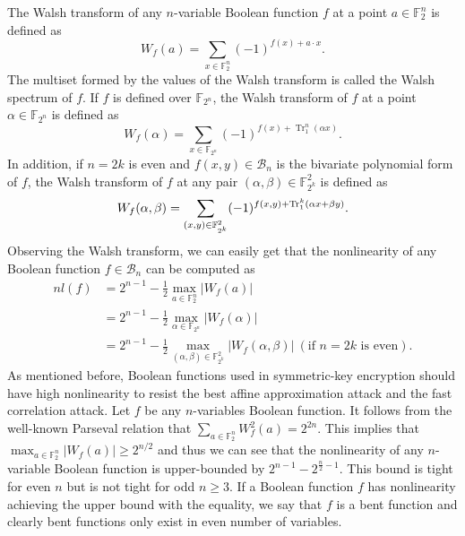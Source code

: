 \documentclass{article}
\newcommand{\F}{\mathbb{F}}
\newcommand{\0}{\textbf{0}}
\newcommand{\1}{\textbf{1}}
\newcommand{\TrN}{\operatorname{Tr}_1^n}
\theoremstyle{plain}
\begin{document}
    The Walsh transform of any $n$-variable Boolean function $f$ at a point $a\in\F_2^n$ is defined as
    \[W_f(a)=\sum_{x\in\F_2^n}(-1)^{f(x)+a\cdot x}.\]
    The multiset formed by the values of the Walsh transform is called the Walsh spectrum of $f$.
    If $f$ is defined over $\F_{2^n}$, the Walsh transform of $f$ at a point $\alpha\in\F_{2^n}$ is defined as
    \[W_f(\alpha)=\sum_{x\in\F_{2^n}}(-1)^{f(x)+\TrN(\alpha x)}.\]
    In addition, if $n=2k$ is even and $f(x,y)\in\mathcal{B}_n$ is the bivariate polynomial form of $f$, the Walsh transform of $f$ at any pair $(\alpha,\beta)\in\F_{2^k}^2$ is defined as
    \[W_f(\alpha,\beta)=\sum_{(x,y)\in\F_{2^k}^2}(-1)^{f(x,y)+\Tr_1^k(\alpha x+\beta y)}.\]
    Observing the Walsh transform, we can easily get that the nonlinearity of any Boolean function $f\in\mathcal{B}_n$ can be computed as
    \begin{align*}
        nl(f) &= 2^{n-1} - \frac{1}{2}\max_{a\in\F_2^n}|W_f(a)|\\
              &= 2^{n-1} - \frac{1}{2}\max_{\alpha\in\F_{2^n}}|W_f(\alpha)|\\
              &= 2^{n-1} - \frac{1}{2}\max_{(\alpha,\beta)\in\F_{2^k}^2}|W_f(\alpha,\beta)|~(\text{if }n=2k\text{ is even}).
    \end{align*}
    As mentioned before, Boolean functions used in symmetric-key encryption should have high nonlinearity to resist the best affine approximation attack and the fast correlation attack.
   Let $f$ be any $n$-variables Boolean function. It follows from the well-known Parseval relation that $\sum_{a\in\F_2^n}W_f^2(a)=2^{2n}$.
   This implies that $\max_{a\in\F_2^n}\left\lvert W_f(a)\right\rvert \geq  2^{n/2}$ and thus we can see that
   the nonlinearity of any $n$-variable Boolean function is upper-bounded by $2^{n-1}-2^{\frac{n}{2}-1}$.
    This bound is tight for even $n$ but is not tight for odd $n\geq 3$.
    If a Boolean function $f$ has nonlinearity achieving the upper bound with the equality,
    we say that $f$ is a bent function and clearly bent functions only exist in even number of variables.
\end{document}
